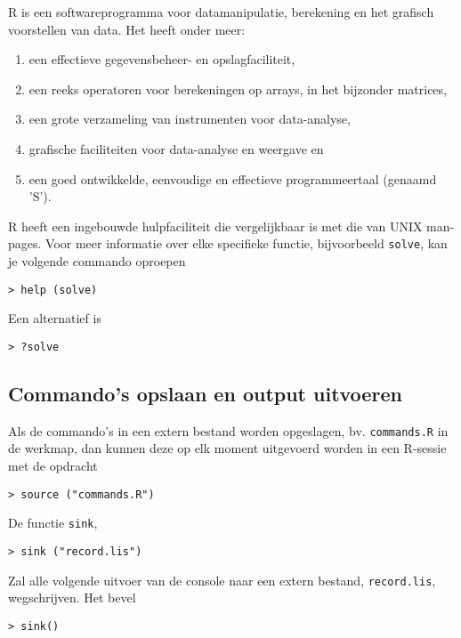 R is een softwareprogramma voor datamanipulatie, berekening en het grafisch voorstellen van data. Het heeft onder meer:

\begin{enumerate}
  \item een effectieve gegevensbeheer- en opslagfaciliteit,
  \item een reeks operatoren voor berekeningen op arrays, in het bijzonder matrices,
  \item een grote verzameling van instrumenten voor data-analyse,
  \item grafische faciliteiten voor data-analyse en weergave en
  \item een goed ontwikkelde, eenvoudige en effectieve programmeertaal (genaamd 'S').
\end{enumerate}

R heeft een ingebouwde hulpfaciliteit die vergelijkbaar is met die van UNIX man-pages. Voor meer informatie over elke specifieke functie, bijvoorbeeld \texttt{solve}, kan je volgende commando oproepen

\begin{lstlisting}
> help (solve)
\end{lstlisting}

Een alternatief is
\begin{lstlisting}
> ?solve
\end{lstlisting}

\subsection{Commando's opslaan en output uitvoeren}

Als de commando's in een extern bestand worden opgeslagen, bv. \texttt{commands.R} in de werkmap, dan kunnen deze op elk moment uitgevoerd worden in een R-sessie met de opdracht

\begin{lstlisting}
> source ("commands.R")
\end{lstlisting}

De functie \texttt{sink},

\begin{lstlisting}
> sink ("record.lis")
\end{lstlisting}

Zal alle volgende uitvoer van de console naar een extern bestand, \texttt{record.lis}, wegschrijven. Het bevel

\begin{lstlisting}
> sink()
\end{lstlisting}

